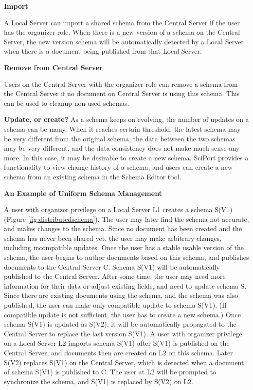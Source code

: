 \documentclass{singlecol-new}
\theoremstyle{TH}{
\newtheorem{lemma}{Lemma}
\newtheorem{theorem}[lemma]{Theorem}
\newtheorem{corrolary}[lemma]{Corrolary}
\newtheorem{conjecture}[lemma]{Conjecture}
\newtheorem{proposition}[lemma]{Proposition}
\newtheorem{claim}[lemma]{Claim}
\newtheorem{stheorem}[lemma]{Wrong Theorem}
\newtheorem{algorithm}{Algorithm}
}
\theoremstyle{THrm}{
\newtheorem{definition}{Definition}[section]
\newtheorem{question}{Question}[section]
\newtheorem{remark}{Remark}
\newtheorem{scheme}{Scheme}
}
\theoremstyle{THhit}{
\newtheorem{case}{Case}[section]
}
\begin{document}
\textbf{Import}

A Local Server can import a shared schema from the Central Server if
the user has the organizer role. When there is a new version of a
schema on the Central Server, the new version schema will be
automatically detected by a Local Server when there is a document
being published from that Local Server.

\textbf{Remove from Central Server}

Users on the Central Server with the organizer role can remove a
schema from the Central Server if no document on Central Server is
using this schema. This can be used to cleanup non-used schemas.

\textbf{Update, or create?}  As a schema  keeps on evolving, the
number of updates on a schema can be many. When it reaches certain
threshold, the latest schema may be very different from the original
schema, the data between the two schemas may be very different, and
the data consistency does not make much sense any more.  In this
case, it may be desirable to create a new schema.  SciPort provides
a functionality to view change history of a schema, and users can
create a new schema from an existing schema in the Schema Editor
tool.


\textbf{An Example of Uniform Schema Management}

A user with organizer privilege on a Local Server L1 creates a
schema S(V1) (Figure \ref{fig:distributedschema}). The user may
later find the schema not accurate, and makes changes to the schema.
Since no document has been created and the schema has never been
shared yet, the user may make arbitrary changes, including
incompatible updates. Once the user has a stable usable version of
the schema, the user begins to author documents based on this
schema, and publishes documents to the Central Server C. Schema
S(V1) will be automatically published to the Central Server. After
some time, the user may need more information for their data or
adjust existing fields, and need to update schema S. Since there are
existing documents using the schema, and the schema was also
published, the user can make only compatible update to schema S(V1).
(If compatible update is not sufficient, the user has to create a
new schema.) Once schema S(V1) is updated as S(V2), it will be
automatically propagated to the Central Server to replace the last
version S(V1). A user with organizer privilege on a Local Server L2
imports schema S(V1) after S(V1) is published on the Central Server,
and documents then are created on L2 on this schema. Later S(V2)
replaces S(V1) on the Central Server, which is detected when a
document of schema S(V1) is published to C. The user at L2 will be
prompted to synchronize the schema, and S(V1) is replaced by S(V2)
on L2.
\end{document}
